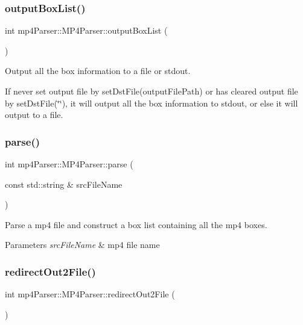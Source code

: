 \subsubsection{\texorpdfstring{outputBoxList()}{outputBoxList()}}
{\footnotesize\ttfamily int mp4\+Parser\+::\+M\+P4\+Parser\+::output\+Box\+List (\begin{DoxyParamCaption}{ }\end{DoxyParamCaption})}



Output all the box information to a file or stdout. 

If never set output file by set\+Dst\+File(output\+File\+Path) or has cleared output file by set\+Dst\+File(\char`\"{}\char`\"{}), it will output all the box information to stdout, or else it will output to a file. \mbox{\label{classmp4_parser_1_1_m_p4_parser_ab91eea9d61232b6db52eda81c65e8ad4}} 
\subsubsection{\texorpdfstring{parse()}{parse()}}
{\footnotesize\ttfamily int mp4\+Parser\+::\+M\+P4\+Parser\+::parse (\begin{DoxyParamCaption}\item[{const std\+::string \&}]{src\+File\+Name }\end{DoxyParamCaption})}



Parse a mp4 file and construct a box list containing all the mp4 boxes. 


\begin{DoxyParams}{Parameters}
{\em src\+File\+Name} & mp4 file name \\
\hline
\end{DoxyParams}
\mbox{\label{classmp4_parser_1_1_m_p4_parser_a29f0fc9e2e0c7ed4751e44b8f28092c3}} 
\subsubsection{\texorpdfstring{redirectOut2File()}{redirectOut2File()}}
{\footnotesize\ttfamily int mp4\+Parser\+::\+M\+P4\+Parser\+::redirect\+Out2\+File (\begin{DoxyParamCaption}{ }\end{DoxyParamCaption})}



